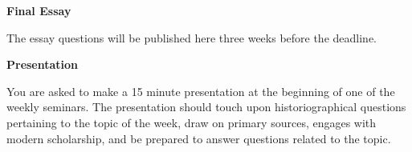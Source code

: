 \documentclass[
]{book}
\begin{document}
\textbf{Final Essay}

The essay questions will be published here three weeks before the deadline.

\textbf{Presentation}

You are asked to make a 15 minute presentation at the beginning of one of the weekly seminars. The presentation should touch upon historiographical questions pertaining to the topic of the week, draw on primary sources, engages with modern scholarship, and be prepared to answer questions related to the topic.

  
\end{document}
